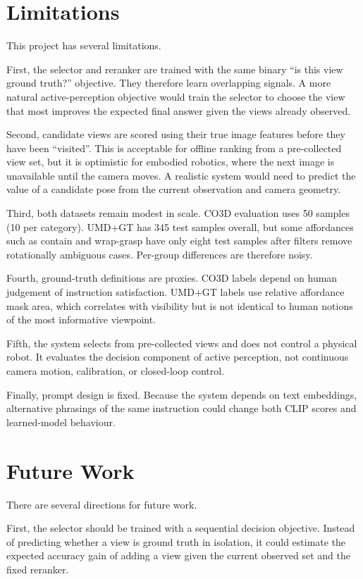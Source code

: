 \section{Limitations}

This project has several limitations.

First, the selector and reranker are trained with the same binary ``is this view ground truth?'' objective. They therefore learn overlapping signals. A more natural active-perception objective would train the selector to choose the view that most improves the expected final answer given the views already observed.

Second, candidate views are scored using their true image features before they have been ``visited''. This is acceptable for offline ranking from a pre-collected view set, but it is optimistic for embodied robotics, where the next image is unavailable until the camera moves. A realistic system would need to predict the value of a candidate pose from the current observation and camera geometry.

Third, both datasets remain modest in scale. CO3D evaluation uses 50 samples (10 per category). UMD+GT has 345 test samples overall, but some affordances such as contain and wrap-grasp have only eight test samples after filters remove rotationally ambiguous cases. Per-group differences are therefore noisy.

Fourth, ground-truth definitions are proxies. CO3D labels depend on human judgement of instruction satisfaction. UMD+GT labels use relative affordance mask area, which correlates with visibility but is not identical to human notions of the most informative viewpoint.

Fifth, the system selects from pre-collected views and does not control a physical robot. It evaluates the decision component of active perception, not continuous camera motion, calibration, or closed-loop control.

Finally, prompt design is fixed. Because the system depends on text embeddings, alternative phrasings of the same instruction could change both CLIP scores and learned-model behaviour.

\section{Future Work}

There are several directions for future work.

First, the selector should be trained with a sequential decision objective. Instead of predicting whether a view is ground truth in isolation, it could estimate the expected accuracy gain of adding a view given the current observed set and the fixed reranker.

